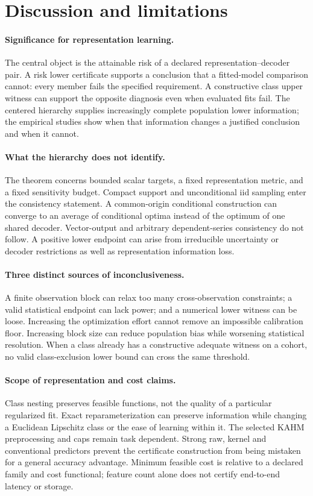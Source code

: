 \section{Discussion and limitations}
\label{sec:discussion}
\paragraph{Significance for representation learning.}
The central object is the attainable risk of a declared representation--decoder pair. A risk lower certificate supports a conclusion that a fitted-model comparison cannot: every member fails the specified requirement. A constructive class upper witness can support the opposite diagnosis even when evaluated fits fail. The centered hierarchy supplies increasingly complete population lower information; the empirical studies show when that information changes a justified conclusion and when it cannot.

\paragraph{What the hierarchy does not identify.}
The theorem concerns bounded scalar targets, a fixed representation metric, and a fixed sensitivity budget. Compact support and unconditional iid sampling enter the consistency statement. A common-origin conditional construction can converge to an average of conditional optima instead of the optimum of one shared decoder. Vector-output and arbitrary dependent-series consistency do not follow. A positive lower endpoint can arise from irreducible uncertainty or decoder restrictions as well as representation information loss.

\paragraph{Three distinct sources of inconclusiveness.}
A finite observation block can relax too many cross-observation constraints; a valid statistical endpoint can lack power; and a numerical lower witness can be loose. Increasing the optimization effort cannot remove an impossible calibration floor. Increasing block size can reduce population bias while worsening statistical resolution. When a class already has a constructive adequate witness on a cohort, no valid class-exclusion lower bound can cross the same threshold.

\paragraph{Scope of representation and cost claims.}
Class nesting preserves feasible functions, not the quality of a particular regularized fit. Exact reparameterization can preserve information while changing a Euclidean Lipschitz class or the ease of learning within it. The selected KAHM preprocessing and caps remain task dependent. Strong raw, kernel and conventional predictors prevent the certificate construction from being mistaken for a general accuracy advantage. Minimum feasible cost is relative to a declared family and cost functional; feature count alone does not certify end-to-end latency or storage.

